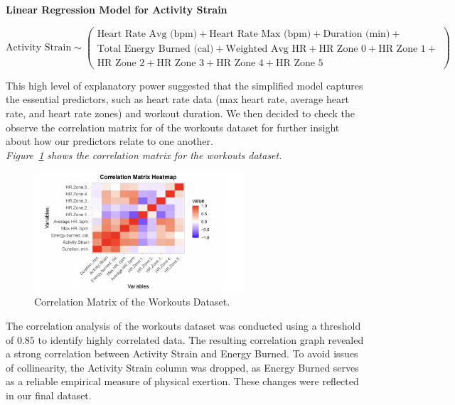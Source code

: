 \documentclass{article}
\begin{document}
\bigskip

\textbf{Linear Regression Model for Activity Strain}

\begin{equation}
\text{Activity Strain} \sim 
\left(
\begin{split}
\text{Heart Rate Avg (bpm)} + \text{Heart Rate Max (bpm)} + \text{Duration (min)} + \\
\text{Total Energy Burned (cal)} + \text{Weighted Avg HR} + \text{HR Zone 0} + \text{HR Zone 1} + \\
\text{HR Zone 2} + \text{HR Zone 3} + \text{HR Zone 4} + \text{HR Zone 5}
\end{split}
\right)
\end{equation}
\bigskip

This high level of explanatory power suggested that the simplified model captures the essential predictors, such as heart rate data (max heart rate, average heart rate, and heart rate zones) and workout duration. We then decided to check the observe the correlation matrix for of the workouts dataset for further insight about how our predictors relate to one another. \\

\textit{Figure~\ref{fig:correlation-matrix-workouts} shows the correlation matrix for the workouts dataset.} \\

\begin{figure}[h!]
  \centering
  \includegraphics[width=0.7\textwidth]{images/workoutscorrelation.png}
  \caption{Correlation Matrix of the Workouts Dataset.}
  \label{fig:correlation-matrix-workouts}
\end{figure}

The correlation analysis of the workouts dataset was conducted using a threshold of $0.85$ to identify highly correlated data. The resulting correlation graph revealed a strong correlation between Activity Strain and Energy Burned. To avoid issues of collinearity, the Activity Strain column was dropped, as Energy Burned serves as a reliable empirical measure of physical exertion. These changes were reflected in our final dataset. \\
\end{document}
